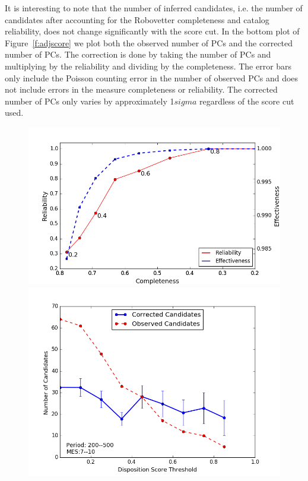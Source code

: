 It is interesting to note that the number of inferred candidates, i.e. the number of candidates after accounting for the Robovetter completeness and catalog reliability, does not change significantly with the score cut. In the bottom plot of Figure~\ref{f:adjscore} we plot both the observed number of PCs and the corrected number of PCs.  The correction is done by taking the number of PCs and multiplying by the reliability and dividing by the completeness.  The error bars only include the Poisson counting error in the number of observed PCs and does not include errors in the measure completeness or reliability. The corrected number of PCs only varies by approximately 1$sigma$ regardless of the score cut used.   

\begin{figure}[h!]
 \begin{center}
  \includegraphics[width=1.0\linewidth]{fig-CRadjustScore-DR25.png}
  \includegraphics[width=1.0\linewidth]{fig-varyScoreNcandidatesBox2.png}

\end{center}
\end{figure}
